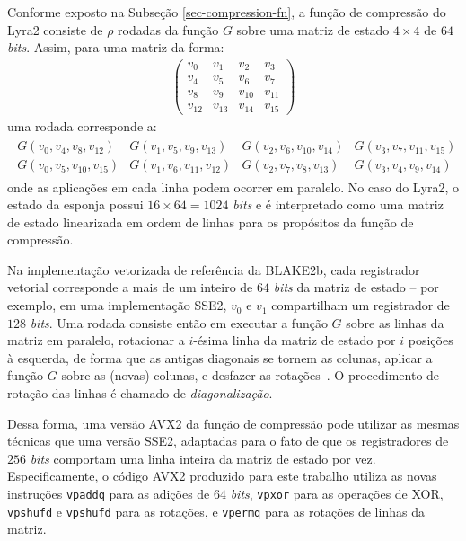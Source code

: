 \documentclass{article}
\begin{document}
Conforme exposto na Subseção \ref{sec-compression-fn}, a função de
compressão do Lyra2 consiste de $\rho$ rodadas da função $G$ sobre uma
matriz de estado $4 \times 4$ de $64$ \emph{bits}. Assim, para uma matriz
da forma:
\begin{align*}
\left(
\begin{matrix}
v_{0} & v_{1} & v_{2} & v_{3} \\
v_{4} & v_{5} & v_{6} & v_{7} \\
v_{8} & v_{9} & v_{10} & v_{11} \\
v_{12} & v_{13} & v_{14} & v_{15}
\end{matrix}
\right)
\end{align*}
uma rodada corresponde a:
\begin{align*}
\begin{matrix}
G(v_{0}, v_{4}, v_{8}, v_{12}) & G(v_{1}, v_{5}, v_{9}, v_{13}) & G(v_{2}, v_{6}, v_{10}, v_{14}) & G(v_{3}, v_{7}, v_{11}, v_{15}) \\
G(v_{0}, v_{5}, v_{10}, v_{15}) & G(v_{1}, v_{6}, v_{11}, v_{12}) & G(v_{2}, v_{7}, v_{8}, v_{13}) & G(v_{3}, v_{4}, v_{9}, v_{14})
\end{matrix}
\end{align*}
onde as aplicações em cada linha podem ocorrer em paralelo. No caso do
Lyra2, o estado da esponja possui $16 \times 64 = 1024$ \emph{bits} e é
interpretado como uma matriz de estado linearizada em ordem de linhas
para os propósitos da função de compressão.

Na implementação vetorizada de referência da BLAKE2b, cada registrador
vetorial corresponde a mais de um inteiro de $64$ \emph{bits} da matriz de
estado -- por exemplo, em uma implementação SSE2, $v_{0}$ e $v_{1}$
compartilham um registrador de $128$ \emph{bits}. Uma rodada consiste então
em executar a função $G$ sobre as linhas da matriz em paralelo, rotacionar
a $i$-ésima linha da matriz de estado por $i$ posições à esquerda, de forma
que as antigas diagonais se tornem as colunas, aplicar a função $G$ sobre
as (novas) colunas, e desfazer as rotações~\cite{blake2b}. O
procedimento de rotação das linhas é chamado de \emph{diagonalização}.

Dessa forma, uma versão AVX2 da função de compressão pode utilizar as
mesmas técnicas que uma versão SSE2, adaptadas para o fato de que os
registradores de $256$ \emph{bits} comportam uma linha inteira da matriz de
estado por vez. Especificamente, o código AVX2 produzido para este
trabalho utiliza as novas instruções \texttt{vpaddq} para as adições de
$64$ \emph{bits}, \texttt{vpxor} para as operações de XOR, \texttt{vpshufd} e
\texttt{vpshufd} para as rotações, e \texttt{vpermq} para as rotações de
linhas da matriz.
\end{document}
